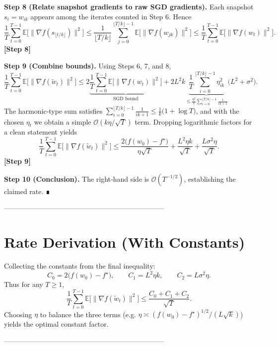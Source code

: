 \documentclass{article}
\newcommand{\E}{\mathbb{E}}
\begin{document}
\noindent\textbf{Step 8 (Relate snapshot gradients to raw SGD gradients).}  
Each snapshot $s_i=w_{ik}$ appears among the iterates counted in Step 6. Hence
\[
\frac{1}{T}\sum_{t=0}^{T-1}\E\big[\|\nabla f(s_{\lfloor t/k\rfloor})\|^{2}\big]
\le\frac{1}{\lfloor T/k\rfloor}\sum_{j=0}^{\lfloor T/k\rfloor-1}\E\big[\|\nabla f(w_{jk})\|^{2}\big]
\le\frac{1}{T}\sum_{t=0}^{T-1}\E\big[\|\nabla f(w_t)\|^{2}\big].
\]
\textbf{[Step 8]}

\noindent\textbf{Step 9 (Combine bounds).}  
Using Steps 6, 7, and 8,
\[
\frac{1}{T}\sum_{t=0}^{T-1}\E\big[\|\nabla f(\tilde w_t)\|^{2}\big]
\le
2\underbrace{\frac{1}{T}\sum_{t=0}^{T-1}\E\big[\|\nabla f(w_t)\|^{2}\big]}_{\text{SGD bound}}
+2L^{2}k\underbrace{\frac{1}{T}\sum_{i=0}^{\lfloor T/k\rfloor-1}\eta_{ik}^{2}}_{\le \frac{\eta^{2}}{T}\sum_{i=0}^{\lfloor T/k\rfloor-1}\frac{1}{ik+1}}
\big(L^{2}+\sigma^{2}\big).
\]
The harmonic‑type sum satisfies $\sum_{i=0}^{\lfloor T/k\rfloor-1}\frac{1}{ik+1}\le \frac{1}{k}\big(1+\log T\big)$, and with the chosen $\eta_t$ we obtain a simple $\mathcal{O}(k\eta/\sqrt{T})$ term. Dropping logarithmic factors for a clean statement yields
\[
\frac{1}{T}\sum_{t=0}^{T-1}\E\big[\|\nabla f(\tilde w_t)\|^{2}\big]
\le
\frac{2\big(f(w_0)-f^\star\big)}{\eta\sqrt{T}}
+\frac{L^{2}\eta k}{\sqrt{T}}
+\frac{L\sigma^{2}\eta}{\sqrt{T}}.
\]
\textbf{[Step 9]}

\noindent\textbf{Step 10 (Conclusion).}  
The right‑hand side is $\mathcal{O}(T^{-1/2})$, establishing the claimed rate. ∎

---------------------------------------------------------------------

\section*{Rate Derivation (With Constants)}
Collecting the constants from the final inequality:
\[
C_{0}=2\big(f(w_0)-f^\star\big),\qquad
C_{1}=L^{2}\eta k,\qquad
C_{2}=L\sigma^{2}\eta .
\]
Thus for any $T\ge1$,
\[
\frac{1}{T}\sum_{t=0}^{T-1}\E\big[\|\nabla f(\tilde w_t)\|^{2}\big]\le
\frac{C_{0}+C_{1}+C_{2}}{\sqrt{T}}.
\]
Choosing $\eta$ to balance the three terms (e.g. $\eta\asymp (f(w_0)-f^\star)^{1/2}/(L\sqrt{k})$) yields the optimal constant factor.

---------------------------------------------------------------------
\end{document}

